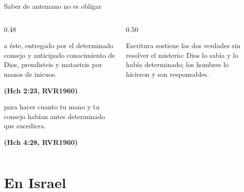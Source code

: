 \documentclass[hyperref={bookmarks=false},aspectratio=169]{beamer}
\newcommand{\fuente}[1]{\par\hfill{\upshape\bfseries\footnotesize\textcolor{azul}{#1}}}
\begin{document}
\begin{frame}{Saber de antemano no es obligar}
\begin{columns}[c,onlytextwidth]
\begin{column}{0.48\textwidth}
\begin{cita}a éste, entregado por el determinado consejo y anticipado conocimiento de Dios, prendisteis y matasteis por manos de inicuos.\fuente{(Hch 2:23, RVR1960)}\end{cita}
\begin{cita}para hacer cuanto tu mano y tu consejo habían antes determinado que sucediera.\fuente{(Hch 4:28, RVR1960)}\end{cita}
\end{column}
\begin{column}{0.50\textwidth}
\centering
{}\par\smallskip
\scriptsize Escritura sostiene las dos verdades sin resolver el misterio: Dios lo sabía y lo había determinado; los hombres lo hicieron y son responsables.
\end{column}
\end{columns}
\end{frame}

\section{En Israel}
\end{document}

